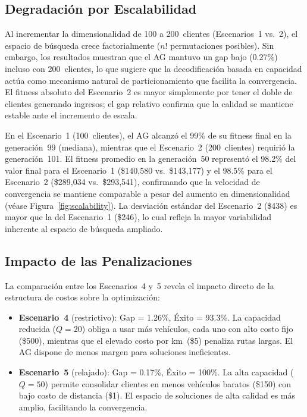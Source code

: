 \documentclass[12pt,letterpaper]{article}
\begin{document}
\subsection{Degradación por Escalabilidad}

Al incrementar la dimensionalidad de 100 a 200~clientes (Escenarios~1 vs.~2), el espacio de búsqueda crece factorialmente ($n!$ permutaciones posibles). Sin embargo, los resultados muestran que el AG mantuvo un gap bajo (0.27\%) incluso con 200~clientes, lo que sugiere que la decodificación basada en capacidad actúa como mecanismo natural de particionamiento que facilita la convergencia. El fitness absoluto del Escenario~2 es mayor simplemente por tener el doble de clientes generando ingresos; el gap relativo confirma que la calidad se mantiene estable ante el incremento de escala.

En el Escenario~1 (100~clientes), el AG alcanzó el 99\% de su fitness final en la generación~99 (mediana), mientras que el Escenario~2 (200~clientes) requirió la generación~101. El fitness promedio en la generación~50 representó el 98.2\% del valor final para el Escenario~1 (\$140{,}580 vs.\ \$143{,}177) y el 98.5\% para el Escenario~2 (\$289{,}034 vs.\ \$293{,}541), confirmando que la velocidad de convergencia se mantiene comparable a pesar del aumento en dimensionalidad (véase Figura~\ref{fig:scalability}). La desviación estándar del Escenario~2 (\$438) es mayor que la del Escenario~1 (\$246), lo cual refleja la mayor variabilidad inherente al espacio de búsqueda ampliado.

\subsection{Impacto de las Penalizaciones}

La comparación entre los Escenarios~4 y~5 revela el impacto directo de la estructura de costos sobre la optimización:

\begin{restrictionbox}
\begin{itemize}
    \item \textbf{Escenario~4} (restrictivo): Gap = 1.26\%, Éxito = 93.3\%. La capacidad reducida ($Q=20$) obliga a usar más vehículos, cada uno con alto costo fijo (\$500), mientras que el elevado costo por km~(\$5) penaliza rutas largas. El AG dispone de menos margen para soluciones ineficientes.
    \item \textbf{Escenario~5} (relajado): Gap = 0.17\%, Éxito = 100\%. La alta capacidad ($Q=50$) permite consolidar clientes en menos vehículos baratos (\$150) con bajo costo de distancia (\$1). El espacio de soluciones de alta calidad es más amplio, facilitando la convergencia.
\end{itemize}
\end{restrictionbox}
\end{document}
